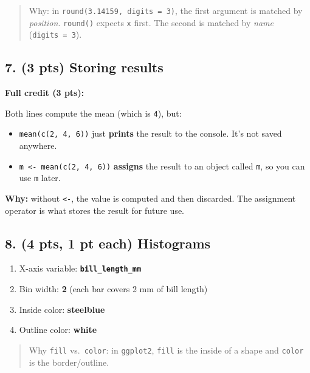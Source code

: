 \documentclass[
  11pt,
  letterpaper,
  DIV=11,
  numbers=noendperiod]{scrartcl}
\providecommand{\tightlist}{%
  \setlength{\itemsep}{0pt}\setlength{\parskip}{0pt}}
\begin{document}
\begin{quote}
Why: in \texttt{round(3.14159,\ digits\ =\ 3)}, the first argument is matched by \textit{position}. \texttt{round()} expects \texttt{x} first. The second is matched by \textit{name} (\texttt{digits\ =\ 3}).
\end{quote}

\hrulefill

\subsection{7. (3 pts) Storing results}

\textbf{Full credit (3 pts):}

Both lines compute the mean (which is \texttt{4}), but:

\begin{itemize}
\tightlist
\item \texttt{mean(c(2,\ 4,\ 6))} just \textbf{prints} the result to the console. It's not saved anywhere.
\item \texttt{m\ \textless{}-\ mean(c(2,\ 4,\ 6))} \textbf{assigns} the result to an object called \texttt{m}, so you can use \texttt{m} later.
\end{itemize}

\textbf{Why:} without \texttt{\textless{}-}, the value is computed and then discarded. The assignment operator is what stores the result for future use.

\hrulefill

\subsection{8. (4 pts, 1 pt each) Histograms}

\begin{enumerate}
\def\labelenumi{(\alph{enumi})}
\item X-axis variable: \textbf{\texttt{bill\_length\_mm}}
\item Bin width: \textbf{2} (each bar covers 2 mm of bill length)
\item Inside color: \textbf{steelblue}
\item Outline color: \textbf{white}
\end{enumerate}

\begin{quote}
Why \texttt{fill} vs.~\texttt{color}: in \texttt{ggplot2}, \texttt{fill} is the inside of a shape and \texttt{color} is the border/outline.
\end{quote}
\end{document}
